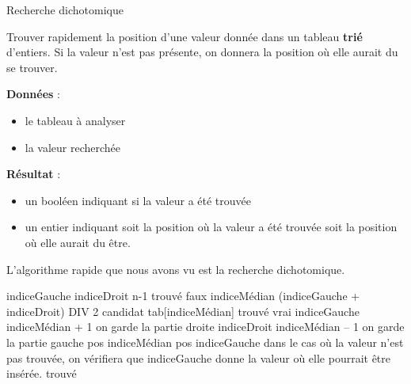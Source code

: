 \begin{Fiche}{Recherche dichotomique}
\label{fiche:dicho}

	Trouver rapidement la position d'une valeur donnée dans un tableau
	\textbf{trié} d'entiers. 
	Si la valeur n'est pas présente, 
	on donnera la position où elle aurait du se trouver.

	
	\textbf{Données} : 
		\begin{itemize}
		\item le tableau à analyser
		\item la valeur recherchée
		\end{itemize}
		
	\textbf{Résultat} :
		\begin{itemize}
		\item un booléen indiquant si la valeur a été trouvée
		\item un entier indiquant
			soit la position où la valeur a été trouvée
			soit la position où elle aurait du être.
		\end{itemize}


		L'algorithme rapide que nous avons vu est la recherche
		dichotomique.
		
		\begin{LDA}
				\Empty
				\Let indiceGauche 
				\Let indiceDroit \Gets n-1
				\Let trouvé \Gets faux
				\Empty
					\Let indiceMédian \Gets (indiceGauche + indiceDroit) DIV 2
					\Let candidat \Gets tab[indiceMédian]
						\Let trouvé \Gets vrai
						\Let indiceGauche \Gets indiceMédian + 1
						\RComment on garde la partie droite
					\Else
						\Let indiceDroit \Gets indiceMédian – 1
						\RComment on garde la partie gauche
					\EndIf
				\EndWhile
				\Empty
					\Let pos \Gets indiceMédian
				\Else
					\Let pos \Gets indiceGauche
					\RComment dans le cas où la valeur n’est pas trouvée,
					\Empty 
					\RComment on vérifiera que indiceGauche donne la valeur où elle pourrait être insérée.
				\EndIf
				\Empty
				\Return trouvé
			\EndAlgo
		\end{LDA}	
	
\end{Fiche}
